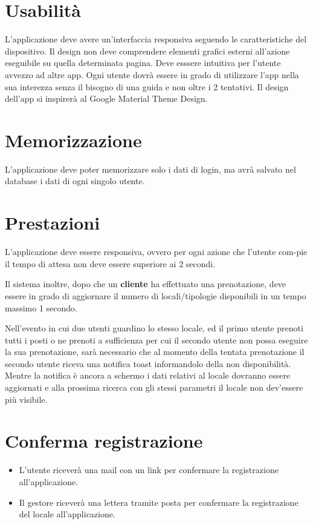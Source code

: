 \section{Usabilità} 
L'applicazione deve avere un'interfaccia responsiva seguendo le caratteristiche del dispositivo. 
Il design non deve comprendere elementi grafici esterni all'azione eseguibile su quella determinata pagina.
Deve esssere intuitiva per l'utente avvezzo ad altre app. 
Ogni utente dovrà essere in grado di utilizzare l'app nella sua interezza senza il bisogno di una guida e non oltre
i 2 tentativi. 
Il design dell'app si inspirerà al Google Material Theme Design.

\section{Memorizzazione} 
L'applicazione deve poter memorizzare solo i dati di login, ma avrà salvato nel database i dati di
ogni singolo utente.

\section{Prestazioni} 
L'applicazione deve essere responsiva, ovvero per ogni azione che l'utente com-pie il tempo di attesa non deve essere
superiore ai 2 secondi.

Il sistema inoltre, dopo che un \textbf{cliente} ha effettuato una prenotazione, deve essere in grado di aggiornare il
numero di locali/tipologie disponibili in un tempo massimo 1 secondo.

Nell'evento in cui due utenti guardino lo stesso locale, ed il primo utente prenoti tutti i posti o ne prenoti a 
sufficienza per cui il secondo utente non possa eseguire la sua prenotazione, sarà necessario che al momento della 
tentata prenotazione il secondo utente riceva una notifica toast informandolo della non disponibilità. Mentre la notifica 
è ancora a schermo i dati relativi al locale dovranno essere aggiornati e alla prossima ricerca con gli stessi parametri 
il locale non dev'essere più visibile.

\section{Conferma registrazione}
\begin{itemize}
    \item L'utente riceverà una mail con un link per confermare la registrazione all'applicazione.
    \item Il gestore riceverà una lettera tramite posta per confermare la registrazione del locale all'applicazione.
\end{itemize}
